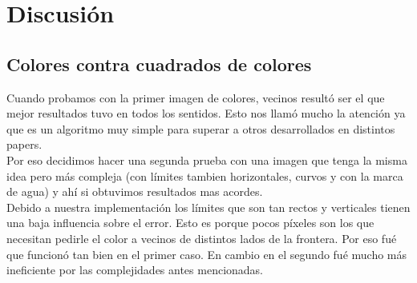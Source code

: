 \section{Discusi\'on}

\subsection{Colores contra cuadrados de colores}
Cuando probamos con la primer imagen de colores, vecinos resultó ser el que mejor resultados tuvo en todos los sentidos. Esto nos llamó mucho la atención ya que es un algoritmo muy simple para superar a otros desarrollados en distintos papers.\\
Por eso decidimos hacer una segunda prueba con una imagen que tenga la misma idea pero más compleja (con límites tambien horizontales, curvos y con la marca de agua) y ahí si obtuvimos resultados mas acordes.\\
Debido a nuestra implementación los límites que son tan rectos y verticales tienen una baja influencia sobre el error. Esto es porque pocos píxeles son los que necesitan pedirle el color a vecinos de distintos lados de la frontera. Por eso fué que funcionó tan bien en el primer caso. En cambio en el segundo fué mucho más ineficiente por las complejidades antes mencionadas.
